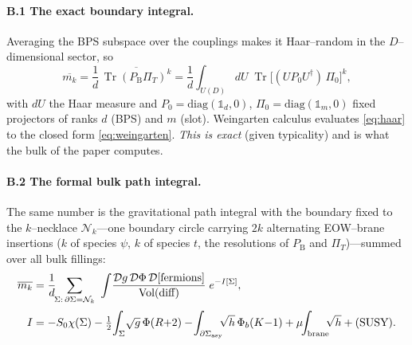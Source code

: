 \documentclass[11pt]{article}
\newcommand{\Tr}{\operatorname{Tr}}
\newcommand{\PB}{P_{\mathrm B}}
\newcommand{\PiT}{\Pi_T}
\newcommand{\dg}{^{\dagger}}
\newif\ifpedagogical
\newcommand{\ped}[1]{\ifpedagogical\par\smallskip{\small\color{pedcol}%
  \leftskip=1.4em\rightskip=1.4em\noindent$\triangleright$~\textit{Plain-language aside.}~#1\par}%
  \par\smallskip\fi}
\begin{document}
\ped{``Path integral'' here has two meanings. One is a genuine, finite, well--defined integral over
random unitaries---that is what we actually compute (B.1). The other is the formal 2d--gravity path
integral over geometries (B.2), which we do not define rigorously but which the topological reduction
(B.3) turns back into (B.1). So the honest statement is: B.1 is the computation; B.2 is the picture.}

\paragraph{B.1 The exact boundary integral.}
Averaging the BPS subspace over the couplings makes it Haar--random in the $D$--dimensional sector, so
\begin{equation}
  \overline{m_k}=\frac1d\,\overline{\Tr(\PB\PiT)^k}
  =\frac1d\int_{U(D)}\!\! dU\;\Tr\!\big[(UP_0U\dg)\,\Pi_0\big]^k,
  \label{eq:haar}
\end{equation}
with $dU$ the Haar measure and $P_0=\mathrm{diag}(\mathbb 1_d,0)$, $\Pi_0=\mathrm{diag}(\mathbb1_m,0)$
fixed projectors of ranks $d$ (BPS) and $m$ (slot). Weingarten calculus evaluates \eqref{eq:haar} to
the closed form \eqref{eq:weingarten}. \emph{This is exact} (given typicality) and is what the bulk
of the paper computes.

\paragraph{B.2 The formal bulk path integral.}
The same number is the gravitational path integral with the boundary fixed to the $k$--necklace
$\mathcal N_k$---one boundary circle carrying $2k$ alternating EOW--brane insertions ($k$ of species
$\psi$, $k$ of species $t$, the resolutions of $\PB$ and $\PiT$)---summed over all bulk fillings:
\begin{align}
  \overline{m_k}&=\frac1d\!\!\sum_{\Sigma:\,\partial\Sigma=\mathcal N_k}\ \int\!
  \frac{\mathcal Dg\,\mathcal D\Phi\,\mathcal D[\text{fermions}]}{\mathrm{Vol(diff)}}\;e^{-I[\Sigma]},
  \label{eq:formalPI}\\[2pt]
  I&=-S_0\chi(\Sigma)-\tfrac12\!\int_\Sigma\!\sqrt g\,\Phi(R{+}2)-\!\int_{\partial\Sigma_{\rm asy}}\!\!\!\sqrt h\,\Phi_b(K{-}1)+\mu\!\!\int_{\rm brane}\!\!\!\sqrt h+(\text{SUSY}).
  \notag
\end{align}
\end{document}
